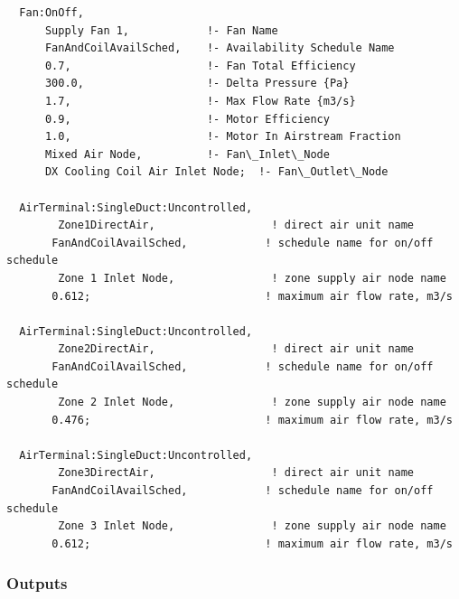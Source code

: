 \begin{lstlisting}
  Fan:OnOff,
      Supply Fan 1,            !- Fan Name
      FanAndCoilAvailSched,    !- Availability Schedule Name
      0.7,                     !- Fan Total Efficiency
      300.0,                   !- Delta Pressure {Pa}
      1.7,                     !- Max Flow Rate {m3/s}
      0.9,                     !- Motor Efficiency
      1.0,                     !- Motor In Airstream Fraction
      Mixed Air Node,          !- Fan\_Inlet\_Node
      DX Cooling Coil Air Inlet Node;  !- Fan\_Outlet\_Node

  AirTerminal:SingleDuct:Uncontrolled,
        Zone1DirectAir,                  ! direct air unit name
       FanAndCoilAvailSched,            ! schedule name for on/off schedule
        Zone 1 Inlet Node,               ! zone supply air node name
       0.612;                           ! maximum air flow rate, m3/s

  AirTerminal:SingleDuct:Uncontrolled,
        Zone2DirectAir,                  ! direct air unit name
       FanAndCoilAvailSched,            ! schedule name for on/off schedule
        Zone 2 Inlet Node,               ! zone supply air node name
       0.476;                           ! maximum air flow rate, m3/s

  AirTerminal:SingleDuct:Uncontrolled,
        Zone3DirectAir,                  ! direct air unit name
       FanAndCoilAvailSched,            ! schedule name for on/off schedule
        Zone 3 Inlet Node,               ! zone supply air node name
       0.612;                           ! maximum air flow rate, m3/s
\end{lstlisting}

\subsubsection{Outputs}\label{outputs-3-021}

